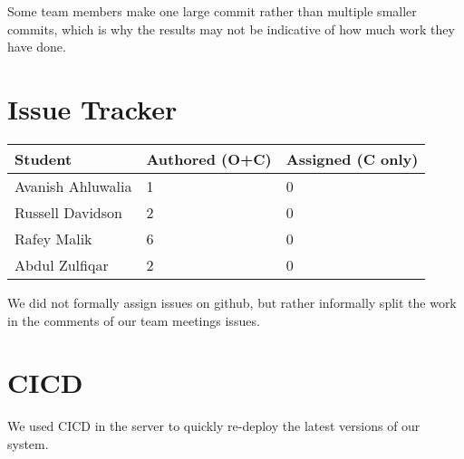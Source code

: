 \documentclass{article}
\begin{document}
Some team members make one large commit rather than multiple smaller commits, which is why the results may not be indicative of how much work they have done.

\section{Issue Tracker}

\begin{table}[H]
\centering
\begin{tabular}{lll}
\toprule
\textbf{Student} & \textbf{Authored (O+C)} & \textbf{Assigned (C only)}\\
\midrule
Avanish Ahluwalia & 1 & 0\\
Russell Davidson & 2 & 0\\
Rafey Malik & 6 & 0\\
Abdul Zulfiqar & 2 & 0\\
\bottomrule
\end{tabular}
\end{table}

We did not formally assign issues on github, but rather informally split the work in the comments of our team meetings issues.

\section{CICD}

We used CICD in the server to quickly re-deploy the latest versions of our system.
\end{document}
